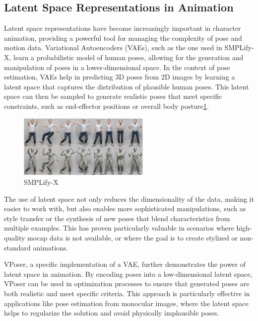\documentclass[../../main.tex]{subfiles}
\begin{document}
\subsection{Latent Space Representations in Animation}
\label{ch:motion_matching:related_work:latent_space}

Latent space representations have become increasingly important in character animation, providing a powerful tool for managing the complexity of pose and motion data. Variational Autoencoders (VAEs)\cite{kingma2013auto}, such as the one used in SMPLify-X\cite{pavlakos2019expressive}, learn a probabilistic model of human poses, allowing for the generation and manipulation of poses in a lower-dimensional space. In the context of pose estimation, VAEs help in predicting 3D poses from 2D images by learning a latent space that captures the distribution of plausible human poses. This latent space can then be sampled to generate realistic poses that meet specific constraints, such as end-effector positions or overall body posture\ref{fig:simplifyx}.

\begin{figure}
  \centering \includegraphics[width = 2.5in]{chapters/motion_matching/images/simplifyx.png}
  \caption{SMPLify-X}
  \label{fig:simplifyx}
\end{figure}

The use of latent space not only reduces the dimensionality of the data, making it easier to work with, but also enables more sophisticated manipulations, such as style transfer or the synthesis of new poses that blend characteristics from multiple examples. This has proven particularly valuable in scenarios where high-quality mocap data is not available, or where the goal is to create stylized or non-standard animations.

VPoser\cite{pavlakos2019expressive}, a specific implementation of a VAE, further demonstrates the power of latent space in animation. By encoding poses into a low-dimensional latent space, VPoser can be used in optimization processes to ensure that generated poses are both realistic and meet specific criteria. This approach is particularly effective in applications like pose estimation from monocular images, where the latent space helps to regularize the solution and avoid physically implausible poses.
\end{document}
